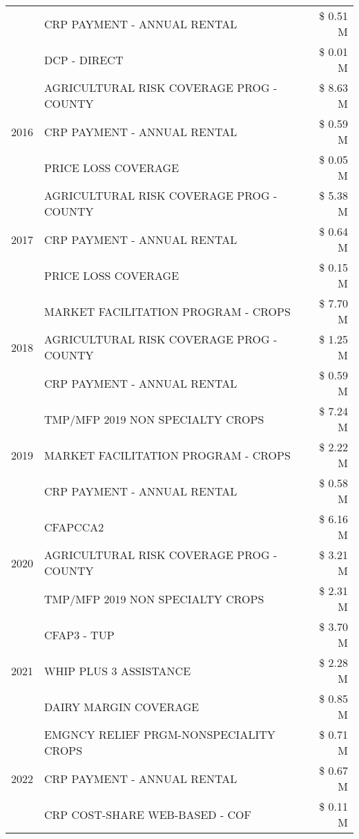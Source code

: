 \begin{tabular}{llr}
 & CRP PAYMENT - ANNUAL RENTAL & \$ 0.51 M \\
 & DCP - DIRECT & \$ 0.01 M \\
\cline{1-3}
\multirow[t]{3}{*}{2016} & AGRICULTURAL RISK COVERAGE PROG - COUNTY & \$ 8.63 M \\
 & CRP PAYMENT - ANNUAL RENTAL & \$ 0.59 M \\
 & PRICE LOSS COVERAGE & \$ 0.05 M \\
\cline{1-3}
\multirow[t]{3}{*}{2017} & AGRICULTURAL RISK COVERAGE PROG - COUNTY & \$ 5.38 M \\
 & CRP PAYMENT - ANNUAL RENTAL & \$ 0.64 M \\
 & PRICE LOSS COVERAGE & \$ 0.15 M \\
\cline{1-3}
\multirow[t]{3}{*}{2018} & MARKET FACILITATION PROGRAM - CROPS & \$ 7.70 M \\
 & AGRICULTURAL RISK COVERAGE PROG - COUNTY & \$ 1.25 M \\
 & CRP PAYMENT - ANNUAL RENTAL & \$ 0.59 M \\
\cline{1-3}
\multirow[t]{3}{*}{2019} & TMP/MFP 2019 NON SPECIALTY CROPS & \$ 7.24 M \\
 & MARKET FACILITATION PROGRAM - CROPS & \$ 2.22 M \\
 & CRP PAYMENT - ANNUAL RENTAL & \$ 0.58 M \\
\cline{1-3}
\multirow[t]{3}{*}{2020} & CFAPCCA2 & \$ 6.16 M \\
 & AGRICULTURAL RISK COVERAGE PROG - COUNTY & \$ 3.21 M \\
 & TMP/MFP 2019 NON SPECIALTY CROPS & \$ 2.31 M \\
\cline{1-3}
\multirow[t]{3}{*}{2021} & CFAP3 - TUP & \$ 3.70 M \\
 & WHIP PLUS 3 ASSISTANCE & \$ 2.28 M \\
 & DAIRY MARGIN COVERAGE & \$ 0.85 M \\
\cline{1-3}
\multirow[t]{3}{*}{2022} & EMGNCY RELIEF PRGM-NONSPECIALITY CROPS & \$ 0.71 M \\
 & CRP PAYMENT - ANNUAL RENTAL & \$ 0.67 M \\
 & CRP COST-SHARE WEB-BASED - COF & \$ 0.11 M \\
\cline{1-3}
\bottomrule
\end{tabular}
